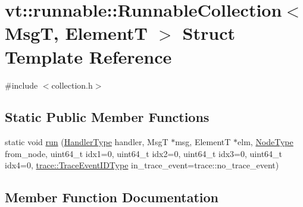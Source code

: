 \hypertarget{structvt_1_1runnable_1_1_runnable_collection}{}\section{vt\+:\+:runnable\+:\+:Runnable\+Collection$<$ MsgT, ElementT $>$ Struct Template Reference}
\label{structvt_1_1runnable_1_1_runnable_collection}


{\ttfamily \#include $<$collection.\+h$>$}

\subsection*{Static Public Member Functions}
\begin{DoxyCompactItemize}
\item 
static void \hyperlink{structvt_1_1runnable_1_1_runnable_collection_ae7c5cd20ddb0a27281366957cc94185a}{run} (\hyperlink{namespacevt_af64846b57dfcaf104da3ef6967917573}{Handler\+Type} handler, MsgT $\ast$msg, ElementT $\ast$elm, \hyperlink{namespacevt_a866da9d0efc19c0a1ce79e9e492f47e2}{Node\+Type} from\+\_\+node, uint64\+\_\+t idx1=0, uint64\+\_\+t idx2=0, uint64\+\_\+t idx3=0, uint64\+\_\+t idx4=0, \hyperlink{namespacevt_1_1trace_a64a7185f3e102df8d8258f263ccd1582}{trace\+::\+Trace\+Event\+I\+D\+Type} in\+\_\+trace\+\_\+event=trace\+::no\+\_\+trace\+\_\+event)
\end{DoxyCompactItemize}


\subsection{Member Function Documentation}
\mbox{\label{structvt_1_1runnable_1_1_runnable_collection_ae7c5cd20ddb0a27281366957cc94185a}} 
